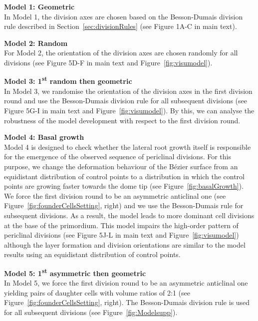 \documentclass[11pt,a4paper, final]{article}
\begin{document}
\noindent
\textbf{Model 1: Geometric}\\
\noindent
In Model 1, the division axes are chosen based on the Besson-Dumais division rule described in Section~\ref{sec:divisionRules} (see Figure 1A-C in main text).

\noindent
\textbf{Model 2: Random}\\
\noindent
For Model 2, the orientation of the division axes are chosen randomly for all divisions (see Figure 5D-F in main text and Figure~\ref{fig:visumodel}).

\noindent
\textbf{Model 3: 1\textsuperscript{st} random then geometric}\\
\noindent
In Model 3, we randomise the orientation of the division axes in the first division round and use the Besson-Dumais division rule for all subsequent divisions (see Figure 5G-I in main text and Figure~\ref{fig:visumodel}). By this, we can analyse the robustness of the model development with respect to the first division round.

\noindent
\textbf{Model 4: Basal growth}\\
\noindent
Model 4 is designed to check whether the lateral root growth itself is responsible for the emergence of the observed sequence of periclinal divisions. For this purpose, we change the deformation behaviour of the B\'ezier surface from an equidistant distribution of control points to a distribution in which the control points are growing faster towards the dome tip (see Figure~\ref{fig:basalGrowth}). We force the first division round to be an asymmetric anticlinal one (see Figure~\ref{fig:founderCellsSetting}, right) and we use the Besson-Dumais rule for subsequent divisions. As a result, the model leads to more dominant cell divisions at the base of the primordium. This model impairs the high-order pattern of periclinal divisions (see Figure 5J-L in main text and Figure~\ref{fig:visumodel}) although the layer formation and division orientations are similar to the model results using an equidistant distribution of control points.

\noindent
\textbf{Model 5: 1\textsuperscript{st} asymmetric then geometric}\\
\noindent
In Model 5, we force the first division round to be an asymmetric anticlinal one yielding pairs of daughter cells with volume ratios of 2:1 (see Figure~\ref{fig:founderCellsSetting}, right). The Besson-Dumais division rule is used for all subsequent divisions (see Figure~\ref{fig:Modelsupp}).
\end{document}
